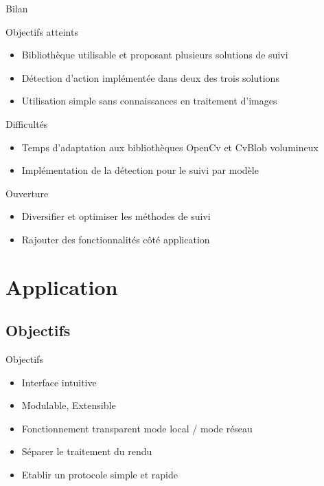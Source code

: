 \documentclass{beamer}
\begin{document}
            \begin{frame}{Bilan}
                  \begin{exampleblock}{Objectifs atteints}
                        \begin{itemize}
                        \item Bibliothèque utilisable et proposant plusieurs solutions de suivi
                        \item Détection d'action implémentée dans deux des trois solutions
                        \item Utilisation simple sans connaissances en traitement d'images
                        \end{itemize}
                  \end{exampleblock}
                  \pause
                  \begin{alertblock}{Difficultés}
                        \begin{itemize}
                        \item Temps d'adaptation aux bibliothèques OpenCv et CvBlob volumineux
                        \item Implémentation de la détection pour le suivi par modèle 
                        \end{itemize}
                  \end{alertblock}
                  \pause		  
                  \begin{block}{Ouverture}
			 \begin{itemize}
                        \item Diversifier et optimiser les méthodes de suivi
                        \item Rajouter des fonctionnalités côté application
			\end{itemize}
                  \end{block}				  
            \end{frame}
      
	
	\section{Application}
	
		\subsection{Objectifs}
		\begin{frame}{Objectifs}
			\begin{itemize}
				\item Interface intuitive
				\item Modulable, Extensible
				\item Fonctionnement transparent mode local / mode réseau
				\item Séparer le traitement du rendu
				\item Etablir un protocole simple et rapide
			\end{itemize}
		\end{frame}
	
\end{document}
